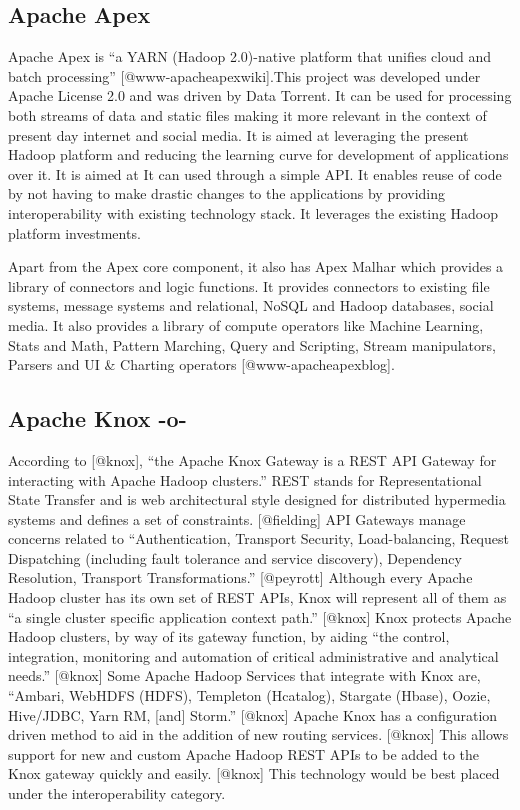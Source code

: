 \subsection{Apache Apex}
     
Apache Apex is ``a YARN (Hadoop 2.0)-native platform that unifies
cloud and batch processing'' [@www-apacheapexwiki].This project
was developed under Apache License 2.0 and was driven by Data
Torrent. It can be used for processing both streams of data and static
files making it more relevant in the context of present day internet
and social media. It is aimed at leveraging the present Hadoop
platform and reducing the learning curve for development of
applications over it. It is aimed at It can used through a simple
API. It enables reuse of code by not having to make drastic changes to
the applications by providing interoperability with existing
technology stack. It leverages the existing Hadoop platform
investments.

Apart from the Apex core component, it also has Apex Malhar which
provides a library of connectors and logic functions. It provides
connectors to existing file systems, message systems and relational,
NoSQL and Hadoop databases, social media. It also provides a library
of compute operators like Machine Learning, Stats and Math, Pattern
Marching, Query and Scripting, Stream manipulators, Parsers and UI \&
Charting operators [@www-apacheapexblog].

\subsection{Apache Knox -o-}

According to [@knox], ``the Apache Knox Gateway is a REST API
Gateway for interacting with Apache Hadoop clusters.'' REST stands for
Representational State Transfer and is web architectural style
designed for distributed hypermedia systems and defines a set of
constraints. [@fielding] API Gateways manage concerns related to
``Authentication, Transport Security, Load-balancing, Request
Dispatching (including fault tolerance and service discovery),
Dependency Resolution, Transport Transformations.'' [@peyrott]
Although every Apache Hadoop cluster has its own set of REST APIs,
Knox will represent all of them as ``a single cluster specific
application context path.'' [@knox] Knox protects Apache Hadoop
clusters, by way of its gateway function, by aiding ``the control,
integration, monitoring and automation of critical administrative and
analytical needs.'' [@knox] Some Apache Hadoop Services that
integrate with Knox are, ``Ambari, WebHDFS (HDFS), Templeton
(Hcatalog), Stargate (Hbase), Oozie, Hive/JDBC, Yarn RM, [and]
Storm.'' [@knox] Apache Knox has a configuration driven method to
aid in the addition of new routing services. [@knox] This allows
support for new and custom Apache Hadoop REST APIs to be added to the
Knox gateway quickly and easily. [@knox] This technology would be
best placed under the interoperability category.

